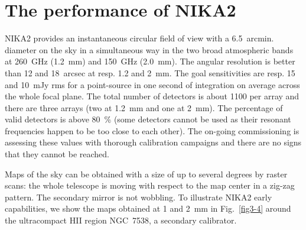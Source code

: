 \documentclass{sf2a-conf2016}
\def\BibTeX{{\rm B\kern-.05em{\sc i\kern-.025em b}\kern-.08em
    T\kern-.1667em\lower.7ex\hbox{E}\kern-.125emX}}
\newcommand{\kms}{{\mathrm{km~s^{-1}}}}
\newcommand{\kpc}{{\mathrm{kpc}}}
\begin{document}
\section{The performance of NIKA2}


NIKA2 provides an instantaneous circular field of view with a
6.5~arcmin. diameter on the sky in a simultaneous way in the two broad
atmospheric bands at 260~GHz (1.2~mm) and 150~GHz (2.0~mm). The angular
resolution is better than 12 and 18~arcsec at resp. 1.2 and 2~mm. The goal
sensitivities are resp. 15 and 10~mJy rms for a point-source in one second of
integration on average across the whole focal plane. The total number of
detectors is about 1100 per array and there are three arrays (two at 1.2~mm
and one at 2~mm). The percentage of valid detectors is above 80~\% (some
detectors cannot be used as their resonant frequencies happen to be too close to
each other). The on-going commissioning is assessing these values with
thorough calibration campaigns and there are no signs that they cannot be
reached.

Maps of the sky can be obtained with a size of up to several degrees by raster
scans: the whole telescope is moving with respect to the map center in a
zig-zag pattern. The secondary mirror is not wobbling. To illustrate NIKA2
early capabilities, we show the maps obtained at 1 and 2~mm in
Fig.~\ref{fig3-4} around the ultracompact HII region NGC~7538, a secondary
calibrator.

 

\end{document}
